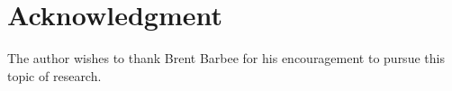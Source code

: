 \documentclass[letterpaper, preprint, paper,11pt]{AAS}	%
\begin{document}








\section{Acknowledgment}
The author wishes to thank Brent Barbee for his encouragement to pursue this topic of research.


\end{document}
